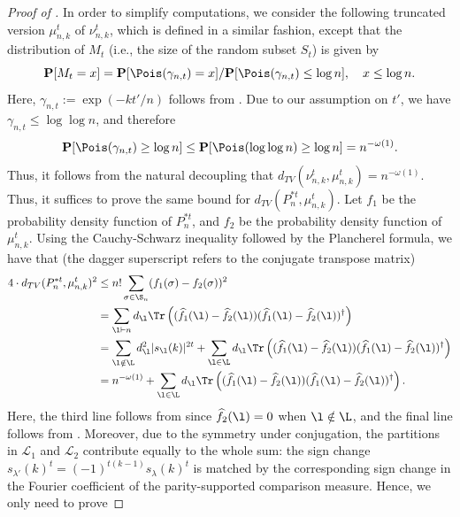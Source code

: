 \begin{proof}[Proof of ]
In order to simplify computations, we consider the following truncated version $\mu_{n,k}^t$ of $\nu_{n,k}^t$, which is defined in a similar fashion, except that the distribution of $M_t$ (i.e., the size of the random subset $S_t$) is given by
$$\mathbf{P}[M_t=x]=\mathbf{P}[\Pois(\gamma_{n,t})=x]/\mathbf{P}[\Pois(\gamma_{n,t})\le\log n],\quad x\le \log n.$$
Here, $\gamma_{n,t}:=\exp(-kt'/n)$ follows from . Due to our assumption on $t'$, we have $\gamma_{n,t}\le\log\log n$, and therefore
\begin{equation}\label{eq: Poisson truncate}
\mathbf{P}[\Pois(\gamma_{n,t})\ge \log n]\le \mathbf{P}[\Pois(\log\log n)\ge \log n]=n^{-\omega(1)}.
\end{equation}
Thus, it follows from the natural decoupling that $d_{TV}(\nu_{n,k}^t,\mu_{n,k}^t)=n^{-\omega(1)}$. Thus, it suffices to prove the same bound for $d_{TV}(P_n^{*t},\mu_{n,k}^t)$. Let $f_1$ be the probability density function of $P_n^{*t}$, and $f_2$ be the probability density function of $\mu_{n,k}^t$. Using the Cauchy-Schwarz inequality followed by the Plancherel formula, we have that (the dagger superscript refers to the conjugate transpose matrix)
\begin{align}
\begin{split}
4\cdot d_{TV}(P_n^{*t},\mu_{n,k}^t)^2&\le n!\sum_{\sigma\in\S_n}(f_1(\sigma)-f_2(\sigma))^2\\
&=\sum_{\l\vdash n}d_\l\Tr\left((\widehat f_1(\l)-\widehat f_2(\l))(\widehat f_1(\l)-\widehat f_2(\l))^\dag\right)\\
&=\sum_{\l\notin\L}d_\l^2|s_\l(k)|^{2t}+\sum_{\l\in\L}d_\l\Tr\left((\widehat f_1(\l)-\widehat f_2(\l))(\widehat f_1(\l)-\widehat f_2(\l))^\dag\right)\\
&=n^{-\omega(1)}+\sum_{\l\in\L}d_\l\Tr\left((\widehat f_1(\l)-\widehat f_2(\l))(\widehat f_1(\l)-\widehat f_2(\l))^\dag\right).\\
\end{split}
\end{align}
Here, the third line follows from  since $\widehat f_2(\l)=0$ when $\l\notin\L$, and the final line follows from . Moreover, due to the symmetry under conjugation, the partitions in $\mathcal L_1$ and $\mathcal L_2$ contribute equally to the whole sum:
the sign change $s_{\lambda'}(k)^t=(-1)^{t(k-1)}s_\lambda(k)^t$ is matched
by the corresponding sign change in the Fourier coefficient of the parity-supported comparison measure. Hence, we only need to prove

\end{proof}
